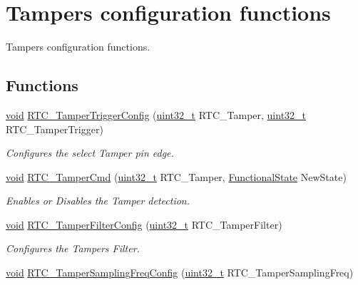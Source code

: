 \hypertarget{group___r_t_c___group9}{\section{Tampers configuration functions}
\label{group___r_t_c___group9}
}


Tampers configuration functions.  


\subsection*{Functions}
\begin{DoxyCompactItemize}
\item 
\hyperlink{group___n_a_m_e_ga18028b8badbf1ea7e704ccac3c488e82}{void} \hyperlink{group___r_t_c___group9_gad547d636cfc4fd8d4d673325571e0ffb}{R\-T\-C\-\_\-\-Tamper\-Trigger\-Config} (\hyperlink{stdint_8h_a435d1572bf3f880d55459d9805097f62}{uint32\-\_\-t} R\-T\-C\-\_\-\-Tamper, \hyperlink{stdint_8h_a435d1572bf3f880d55459d9805097f62}{uint32\-\_\-t} R\-T\-C\-\_\-\-Tamper\-Trigger)
\begin{DoxyCompactList}\small\item\em Configures the select Tamper pin edge. \end{DoxyCompactList}\item 
\hyperlink{group___n_a_m_e_ga18028b8badbf1ea7e704ccac3c488e82}{void} \hyperlink{group___r_t_c___group9_gaf85cc696d624da0de9fbe99779402833}{R\-T\-C\-\_\-\-Tamper\-Cmd} (\hyperlink{stdint_8h_a435d1572bf3f880d55459d9805097f62}{uint32\-\_\-t} R\-T\-C\-\_\-\-Tamper, \hyperlink{group___exported__types_gac9a7e9a35d2513ec15c3b537aaa4fba1}{Functional\-State} New\-State)
\begin{DoxyCompactList}\small\item\em Enables or Disables the Tamper detection. \end{DoxyCompactList}\item 
\hyperlink{group___n_a_m_e_ga18028b8badbf1ea7e704ccac3c488e82}{void} \hyperlink{group___r_t_c___group9_ga1e87b9ae757ad12d7585e4fbcbf2c4b8}{R\-T\-C\-\_\-\-Tamper\-Filter\-Config} (\hyperlink{stdint_8h_a435d1572bf3f880d55459d9805097f62}{uint32\-\_\-t} R\-T\-C\-\_\-\-Tamper\-Filter)
\begin{DoxyCompactList}\small\item\em Configures the Tampers Filter. \end{DoxyCompactList}\item 
\hyperlink{group___n_a_m_e_ga18028b8badbf1ea7e704ccac3c488e82}{void} \hyperlink{group___r_t_c___group9_gadc7f33a31df80b5deac313fc8af8d7f7}{R\-T\-C\-\_\-\-Tamper\-Sampling\-Freq\-Config} (\hyperlink{stdint_8h_a435d1572bf3f880d55459d9805097f62}{uint32\-\_\-t} R\-T\-C\-\_\-\-Tamper\-Sampling\-Freq)

\end{DoxyCompactItemize}
